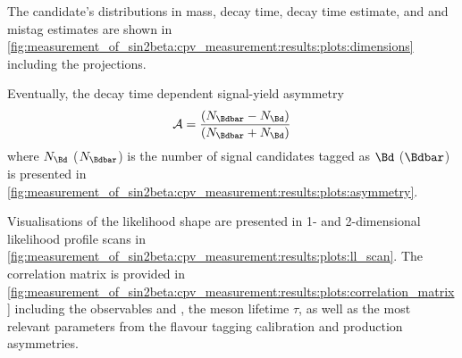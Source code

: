 The \Bmeson candidate's distributions in mass, decay time, decay time estimate, and \OS and
\SSpi mistag estimates are shown in
\cref{fig:measurement_of_sin2beta:cpv_measurement:results:plots:dimensions}
including the \PDF projections. 

Eventually, the decay time dependent signal-yield asymmetry
%
\begin{equation}
  \mathcal{A} = \frac{(N_{\Bdbar} - N_{\Bd})}{(N_{\Bdbar} + N_{\Bd})}
\end{equation}
%
where $N_{\Bd}$ ($N_{\Bdbar}$) is the number of \BdToJpsiKS signal candidates
tagged as $\Bd$ ($\Bdbar$) is presented in
\cref{fig:measurement_of_sin2beta:cpv_measurement:results:plots:asymmetry}.

Visualisations of the likelihood shape are presented in 1- and 2-dimensional
likelihood profile scans in
\cref{fig:measurement_of_sin2beta:cpv_measurement:results:plots:ll_scan}. 
The correlation matrix is provided in 
\cref{fig:measurement_of_sin2beta:cpv_measurement:results:plots:correlation_matrix} 
including the \CP observables \SJpsiKS and \CJpsiKS, the \Bd meson lifetime
$\tau$, as well as the most relevant parameters from the flavour tagging
calibration and production asymmetries.
%
